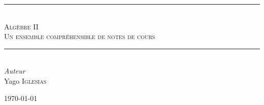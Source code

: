 \documentclass{article}
\theoremstyle{plain}
\theoremstyle{definition}
\theoremstyle{plain}
\begin{document}
\begin{titlepage}
	\newcommand{\HRule}{\rule{\linewidth}{0.5mm}}
	\center

	\HRule\\[0.4cm]

	\textsc{\Large Algèbre II}\\[0.5cm]
	\textsc{\large Un ensemble compréhensible de notes de cours}\\[0.5cm]

	\HRule\\[1.5cm]


	{\large\textit{Auteur}}\\
	Yago \textsc{Iglesias}


	\vfill\vfill\vfill

	{\large\today}

	\vfill

\end{titlepage}


\tableofcontents


\end{document}
